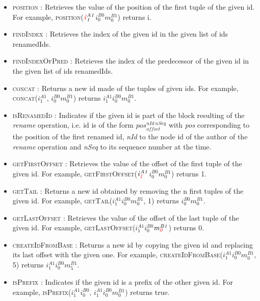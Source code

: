 \documentclass[10pt,journal,compsoc]{IEEEtran}
\newcommand{\ie}{i.e. }
\newcommand{\trm}[1]{\mathit{#1}}
\newcommand{\id}[3]{$\trm{#1}^{\trm{#2}}_{\trm{#3}}$}
\begin{document}
\begin{itemize}
    \item \textsc{position} : Retrieves the value of the position of the first tuple of the given id.
        For example, \textsc{position}(\id{\color{red}i}{A1}{1}\id{i}{B0}{0}\id{m}{B1}{0}) returns {\color{red}i}.
    \item \textsc{findIndex} : Retrieves the index of the given id in the given list of ids renamedIds.
    \item \textsc{findIndexOfPred} : Retrieves the index of the predecessor of the given id in the given list of ids renamedIds.
    \item \textsc{concat} : Returns a new id made of the tuples of given ids.
        For example, \textsc{concat}(\id{i}{A1}{1}, \id{i}{B0}{0}\id{m}{B1}{0}) returns \id{i}{A1}{1}\id{i}{B0}{0}\id{m}{B1}{0}.
    \item \textsc{isRenamedId} : Indicates if the given id is part of the block resulting of the \emph{rename} operation, \ie id is of the form \id{pos}{nId~nSeq}{offset} with \emph{pos} corresponding to the position of the first renamed id, \emph{nId} to the node id of the author of the \emph{rename} operation and \emph{nSeq} to its sequence number at the time.
    \item \textsc{getFirstOffset} : Retrieves the value of the offset of the first tuple of the given id.
        For example, \textsc{getFirstOffset}(\id{i}{A1}{\color{red}1}\id{i}{B0}{0}\id{m}{B1}{0}) returns {\color{red}1}.
    \item \textsc{getTail} : Returns a new id obtained by removing the n first tuples of the given id.
        For example, \textsc{getTail}(\id{i}{A1}{1}\id{i}{B0}{0}\id{m}{B1}{0}, 1) returns \id{i}{B0}{0}\id{m}{B1}{0}.
    \item \textsc{getLastOffset} : Retrieves the value of the offset of the last tuple of the given id.
        For example, \textsc{getLastOffset}(\id{i}{A1}{1}\id{i}{B0}{0}\id{m}{B1}{\color{red}0}) returns {\color{red}0}.
    \item \textsc{createIdFromBase} : Returns a new id by copying the given id and replacing its last offset with the given one.
        For example, \textsc{createIdFromBase}(\id{i}{A1}{1}\id{i}{B0}{0}\id{m}{B1}{0}, 5) returns \id{i}{A1}{1}\id{i}{B0}{0}\id{m}{B1}{5}.
    \item \textsc{isPrefix} : Indicates if the given id is a prefix of the other given id.
        For example, \textsc{isPrefix}(\id{i}{A1}{1}\id{i}{B0}{0}, \id{i}{A1}{1}\id{i}{B0}{0}\id{m}{B1}{0}) returns true.
\end{itemize}
\end{document}
